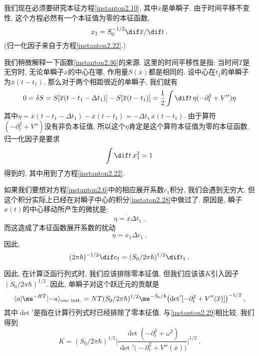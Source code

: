 我们现在必须要研究本征方程\eqref{instanton2.10}, 其中$\overline{x}$是单瞬子. 由于时间平移不变性, 这个方程必然有一个本征值为零的本征函数,
\begin{equation}
    x_{1} = S_{0}^{-1/2} \dif \overline{x}/\dif t \:. \label{instanton2.36}
\end{equation}
(归一化因子来自于方程\eqref{instanton2.22}.)
\begin{tcolorbox}
    我们稍微解释一下函数\eqref{instanton2.36}的来源. 这里的时间平移性是指: 当时间$T$是无穷时, 无论单瞬子$\overline{x}$的中心在哪, 作用量$S(\bar{x})$都是相同的. 设中心在$t_{1}$的单瞬子为$\bar{x}(t-t_{1})$, 那么对于两个相距很近的单瞬子, 我们就有
    \begin{equation*}
        0=\delta S= S[\overline{x}(t-t_{1}-\Delta t_{1})]-S[\overline{x}(t-t_{1})]=\frac{1}{2}\int \dif t\, \eta(-\partial_{t}^{2}+V'')\eta
    \end{equation*} 
    其中$\eta=\overline{x}(t-t_{1}-\Delta t_{1})-\overline{x}(t-t_{1})=-\Delta t_{1} \, \dot{\overline{x}}(t-t_{1})$. 由于算符$(-\partial_{t}^{2}+V'')$没有非负本征值, 所以这个$\eta$肯定是这个算符本征值为零的本征函数. 归一化因子是要求
    \begin{equation*}
        \int \dif t\: x_{1}^{2} =1 
    \end{equation*}
    得到的, 其中用到了方程\eqref{instanton2.22}.
\end{tcolorbox}
如果我们要想对方程\eqref{instanton2.6}中的相应展开系数$c_{1}$积分, 我们会遇到无穷大, 但这个积分实际上已经在对瞬子中心的积分\eqref{instaton2.28}中做过了. 
原因是, 瞬子$\overline{x}(t)$的中心移动所产生的微扰是:
\begin{equation}
    \eta =\dot{\overline{x}} \Delta t_{1} \:. \label{instanton2.37}
\end{equation}
而这造成了本征函数展开系数的扰动
\begin{equation}
    \eta =x_{1}\Delta c_{1} \:. \label{instanton2.38}
\end{equation}
因此,
\begin{equation}
    (2\pi\hbar)^{-1/2} \dif c_{1} = (S_{0}/2\pi\hbar)^{1/2} \dif t_{1} \:.
\end{equation}

因此, 在计算泛函行列式时, 我们应该排除零本征值, 但我们应该该$K$引入因子$(S_{0}/2\pi\hbar)^{1/2}$. 因此, 单瞬子对这个跃迁元的贡献是
\begin{equation}
    \langle a \vert \me^{-HT} \vert {-}a\rangle _{\text{one inst.}} =N T  (S_{0}/2\pi\hbar)^{1/2} \me^{-S_{0}/\hbar}
    \bigl(\det\nolimits'[-\partial_{t}^{2}+V''(\overline{x})]\bigr)^{-1/2} \:, \label{instanton2.40}
\end{equation}
其中$\det'$是指在计算行列式时已经排除了零本征值. 与\eqref{instanton2.29}相比较, 我们得到
\begin{equation}
    K= (S_{0}/2\pi\hbar)^{1/2} \Biggl\lvert \frac{\det(-\partial_{t}^{2}+\omega^{2})}{\det'\bigl(-\partial_{t}^{2}+V''(\overline{x})\bigr)} \Biggr\rvert^{1/2} \:.
\end{equation}

